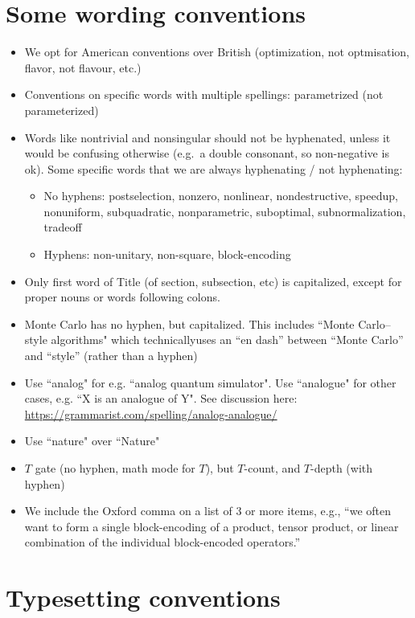 \section{Some wording conventions}

\begin{itemize}
    \item We opt for American conventions over British (optimization, not optmisation, flavor, not flavour, etc.)
    \item Conventions on specific words with multiple spellings: parametrized (not parameterized)
    \item Words like nontrivial and nonsingular should not be hyphenated, unless it would be confusing otherwise (e.g.~a double consonant, so non-negative is ok). Some specific words that we are always hyphenating / not hyphenating:
    \begin{itemize}
        \item No hyphens: postselection, nonzero, nonlinear, nondestructive, speedup, nonuniform, subquadratic, nonparametric, suboptimal, subnormalization, tradeoff
        \item Hyphens: non-unitary, non-square, block-encoding
    \end{itemize}
    \item Only first word of Title (of section, subsection, etc) is capitalized, except for proper nouns or words following colons. 
    \item Monte Carlo has no hyphen, but capitalized. This includes ``Monte Carlo--style algorithms" which technicallyuses an ``en dash'' between ``Monte Carlo'' and ``style'' (rather than a hyphen)
    \item Use ``analog" for e.g. ``analog quantum simulator". Use ``analogue" for other cases, e.g. ``X is an analogue of Y". See discussion here: \url{https://grammarist.com/spelling/analog-analogue/}
    \item Use ``nature" over ``Nature"
    \item $T$ gate (no hyphen, math mode for $T$), but $T$-count, and $T$-depth (with hyphen)
    \item We include the Oxford comma on a list of 3 or more items, e.g., ``we often want to form a single block-encoding of a product, tensor product, or linear combination of the individual block-encoded operators.''
\end{itemize}

\section{Typesetting conventions}

